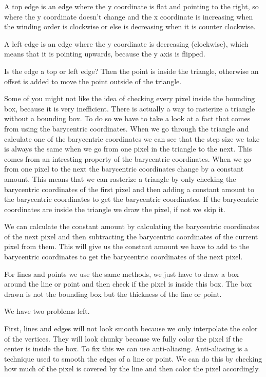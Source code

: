 \documentclass[12pt]{report} \usepackage{preamble}
\begin{document}
A top edge is an edge where the y coordinate is flat and pointing to the right,
so where the y coordinate doesn't change
and the x coordinate is increasing when the winding order is clockwise
or else is decreasing when it is counter clockwise.

A left edge is an edge where the y coordinate is decreasing (clockwise),
which means that it is pointing upwards, because the y axis is flipped.

Is the edge a top or left edge? Then the point is inside the triangle,
otherwise an offset is added to move the point outside of the triangle.

Some of you might not like the idea of checking every pixel inside the bounding box,
because it is very inefficient. There is actually a way to rasterize
a triangle without a bounding box. To do so we have to take a look at
a fact that comes from using the barycentric coordinates.
When we go through the triangle and calculate one of the barycentric coordinates
we can see that the step size we take is always the same
when we go from one pixel in the triangle to the next.
This comes from an intresting property of the barycentric coordinates.
When we go from one pixel to the next the barycentric coordinates
change by a constant amount. This means that we can rasterize a triangle by only checking
the barycentric coordinates of the first pixel and then adding a constant amount
to the barycentric coordinates to get the barycentric coordinates.
If the barycentric coordinates are inside the triangle we draw the pixel, if not we skip it.

We can calculate the constant amount by calculating the barycentric coordinates
of the next pixel and then subtracting the barycentric coordinates
of the current pixel from them. This will give us the constant amount we have to add
to the barycentric coordinates to get the barycentric coordinates of the next pixel.

For lines and points we use the same methods, we just have to draw a box
around the line or point and then check if the pixel is inside this box.
The box drawn is not the bounding box but the thickness of the line or point.

We have two problems left.

First, lines and edges will not look smooth because we only interpolate the color of the vertices.
They will look chunky because we fully color the pixel if the center is inside the box.
To fix this we can use anti-aliasing. Anti-aliasing is a technique used to
smooth the edges of a line or point. We can do this by checking how much of the pixel
is covered by the line and then color the pixel accordingly.
\end{document}
